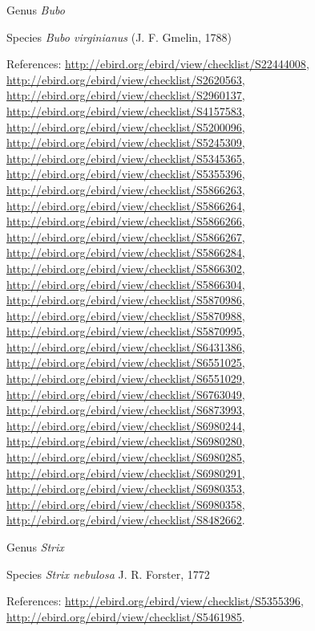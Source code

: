 \documentclass[9pt, article]{memoir}
\begin{document}
\begin{multicols}{2}
\vspace{6pt}\noindent\hspace{30pt}Genus \textit{Bubo}


\vspace{6pt}\noindent\hspace{36pt}Species \textit{Bubo virginianus} (J. F. Gmelin, 1788)


\vspace{6pt}References: 
\url{http://ebird.org/ebird/view/checklist/S22444008}, 
\url{http://ebird.org/ebird/view/checklist/S2620563}, 
\url{http://ebird.org/ebird/view/checklist/S2960137}, 
\url{http://ebird.org/ebird/view/checklist/S4157583}, 
\url{http://ebird.org/ebird/view/checklist/S5200096}, 
\url{http://ebird.org/ebird/view/checklist/S5245309}, 
\url{http://ebird.org/ebird/view/checklist/S5345365}, 
\url{http://ebird.org/ebird/view/checklist/S5355396}, 
\url{http://ebird.org/ebird/view/checklist/S5866263}, 
\url{http://ebird.org/ebird/view/checklist/S5866264}, 
\url{http://ebird.org/ebird/view/checklist/S5866266}, 
\url{http://ebird.org/ebird/view/checklist/S5866267}, 
\url{http://ebird.org/ebird/view/checklist/S5866284}, 
\url{http://ebird.org/ebird/view/checklist/S5866302}, 
\url{http://ebird.org/ebird/view/checklist/S5866304}, 
\url{http://ebird.org/ebird/view/checklist/S5870986}, 
\url{http://ebird.org/ebird/view/checklist/S5870988}, 
\url{http://ebird.org/ebird/view/checklist/S5870995}, 
\url{http://ebird.org/ebird/view/checklist/S6431386}, 
\url{http://ebird.org/ebird/view/checklist/S6551025}, 
\url{http://ebird.org/ebird/view/checklist/S6551029}, 
\url{http://ebird.org/ebird/view/checklist/S6763049}, 
\url{http://ebird.org/ebird/view/checklist/S6873993}, 
\url{http://ebird.org/ebird/view/checklist/S6980244}, 
\url{http://ebird.org/ebird/view/checklist/S6980280}, 
\url{http://ebird.org/ebird/view/checklist/S6980285}, 
\url{http://ebird.org/ebird/view/checklist/S6980291}, 
\url{http://ebird.org/ebird/view/checklist/S6980353}, 
\url{http://ebird.org/ebird/view/checklist/S6980358}, 
\url{http://ebird.org/ebird/view/checklist/S8482662}.

\vspace{6pt}\noindent\hspace{30pt}Genus \textit{Strix}


\vspace{6pt}\noindent\hspace{36pt}Species \textit{Strix nebulosa} J. R. Forster, 1772


\vspace{6pt}References: 
\url{http://ebird.org/ebird/view/checklist/S5355396}, 
\url{http://ebird.org/ebird/view/checklist/S5461985}.


\end{multicols}
\end{document}
